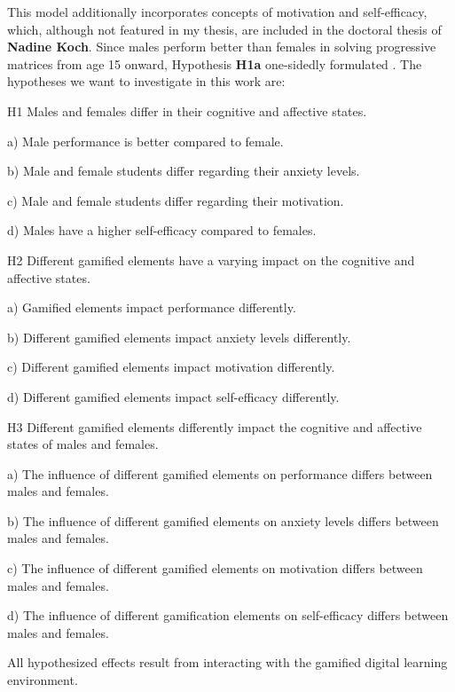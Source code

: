 This model additionally incorporates concepts of motivation and self-efficacy, which, although not featured in my thesis, are included in the doctoral thesis of \textbf{Nadine Koch}.\newline
Since males perform better than females in solving progressive matrices from age 15 onward, Hypothesis \textbf{H1a} one-sidedly formulated \parencite{ravenStandardProgressiveMatrices2003}.
The hypotheses we want to investigate in this work are:
\begin{APAitemize}
    \item[H1] Males and females differ in their cognitive and affective states.
    \begin{APAitemize}
        \item[a)] Male performance is better compared to female.
        \item[b)] Male and female students differ regarding their anxiety levels.
        \item[c)] Male and female students differ regarding their motivation.
        \item[d)] Males have a higher self-efficacy compared to females.
    \end{APAitemize}
    \item[H2] Different gamified elements have a varying impact on the cognitive and affective states.
    \begin{APAitemize}
        \item[a)] Gamified elements impact performance differently.
        \item[b)] Different gamified elements impact anxiety levels differently.
        \item[c)] Different gamified elements impact motivation differently.
        \item[d)] Different gamified elements impact self-efficacy differently.
    \end{APAitemize}
    \item[H3] Different gamified elements differently impact the cognitive and affective states of males and females.
    \begin{APAitemize}
        \item[a)] The influence of different gamified elements on performance differs between males and females.
        \item[b)] The influence of different gamified elements on anxiety levels differs between males and females.
        \item[c)] The influence of different gamified elements on motivation differs between males and females.
        \item[d)] The influence of different gamification elements on self-efficacy differs between males and females.
    \end{APAitemize}
\end{APAitemize}
All hypothesized effects result from interacting with the gamified digital learning environment.